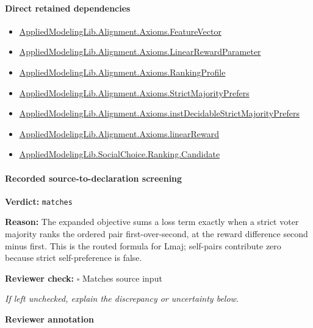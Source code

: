 \documentclass[10pt]{article}
\newcommand{\reviewerbox}{%
  \par\noindent\fbox{\parbox{0.96\linewidth}{\rule{0pt}{0.38in}}}\par
}
\newcommand{\reviewmatch}[1]{%
  \par\noindent\textbf{Reviewer check:} $\square$\; #1\par
  \noindent\emph{If left unchecked, explain the discrepancy or uncertainty below.}\par
}
\begin{document}
\paragraph{Direct retained dependencies}
\begin{itemize}\raggedright
\item \hyperlink{library-prerequisite-a0b67c6a143b0b13}{Applied\allowbreak{}Modeling\allowbreak{}Lib.\allowbreak{}Alignment.\allowbreak{}Axioms.\allowbreak{}Feature\allowbreak{}Vector}
\item \hyperlink{library-prerequisite-d58203ca3f4a8c05}{Applied\allowbreak{}Modeling\allowbreak{}Lib.\allowbreak{}Alignment.\allowbreak{}Axioms.\allowbreak{}Linear\allowbreak{}Reward\allowbreak{}Parameter}
\item \hyperlink{library-prerequisite-9bded048a60dfe0a}{Applied\allowbreak{}Modeling\allowbreak{}Lib.\allowbreak{}Alignment.\allowbreak{}Axioms.\allowbreak{}Ranking\allowbreak{}Profile}
\item \hyperlink{governing-declaration-a094f6e94e1e1408}{Applied\allowbreak{}Modeling\allowbreak{}Lib.\allowbreak{}Alignment.\allowbreak{}Axioms.\allowbreak{}Strict\allowbreak{}Majority\allowbreak{}Prefers}
\item \hyperlink{governing-declaration-0fa9c36f29a7b478}{Applied\allowbreak{}Modeling\allowbreak{}Lib.\allowbreak{}Alignment.\allowbreak{}Axioms.\allowbreak{}inst\allowbreak{}Decidable\allowbreak{}Strict\allowbreak{}Majority\allowbreak{}Prefers}
\item \hyperlink{library-prerequisite-4a32ddda17499d70}{Applied\allowbreak{}Modeling\allowbreak{}Lib.\allowbreak{}Alignment.\allowbreak{}Axioms.\allowbreak{}linear\allowbreak{}Reward}
\item \hyperlink{library-prerequisite-8c0e6c25845ae78a}{Applied\allowbreak{}Modeling\allowbreak{}Lib.\allowbreak{}Social\allowbreak{}Choice.\allowbreak{}Ranking.\allowbreak{}Candidate}
\end{itemize}
\paragraph{Recorded source-to-declaration screening}
\textbf{Verdict:} \texttt{matches}
\\
{\raggedright
\textbf{Reason:} The expanded objective sums a loss term exactly when a strict voter majority ranks the ordered pair first-\allowbreak{}over-\allowbreak{}second, at the reward difference second minus first.\allowbreak{} This is the routed formula for Lmaj;\allowbreak{} self-\allowbreak{}pairs contribute zero because strict self-\allowbreak{}preference is false.\allowbreak{}
\par}
\reviewmatch{Matches source input}
\noindent\textbf{Reviewer annotation}\par
\reviewerbox
\clearpage
\hypertarget{paper-prerequisite-e532c12e5479137f}{}
\end{document}
